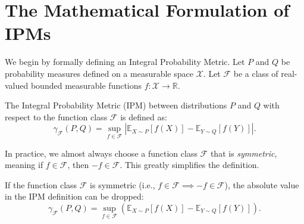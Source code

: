 \section{The Mathematical Formulation of IPMs}

We begin by formally defining an Integral Probability Metric. Let $P$ and $Q$ be probability measures defined on a measurable space $\mathcal{X}$. Let $\mathcal{F}$ be a class of real-valued bounded measurable functions $f: \mathcal{X} \to \mathbb{R}$.

\begin{definition}
The Integral Probability Metric (IPM) between distributions $P$ and $Q$ with respect to the function class $\mathcal{F}$ is defined as:
\begin{equation}
    \gamma_{\mathcal{F}}(P, Q) = \sup_{f \in \mathcal{F}} \left| \mathbb{E}_{X \sim P}[f(X)] - \mathbb{E}_{Y \sim Q}[f(Y)] \right|.
\end{equation}
\end{definition}

In practice, we almost always choose a function class $\mathcal{F}$ that is \textit{symmetric}, meaning if $f \in \mathcal{F}$, then $-f \in \mathcal{F}$. This greatly simplifies the definition.

\begin{theorem}
\label{thm:ipm_symmetric}
If the function class $\mathcal{F}$ is symmetric (i.e., $f \in \mathcal{F} \implies -f \in \mathcal{F}$), the absolute value in the IPM definition can be dropped:
\begin{equation}
    \gamma_{\mathcal{F}}(P, Q) = \sup_{f \in \mathcal{F}} \left( \mathbb{E}_{X \sim P}[f(X)] - \mathbb{E}_{Y \sim Q}[f(Y)] \right).
\end{equation}
\end{theorem}

